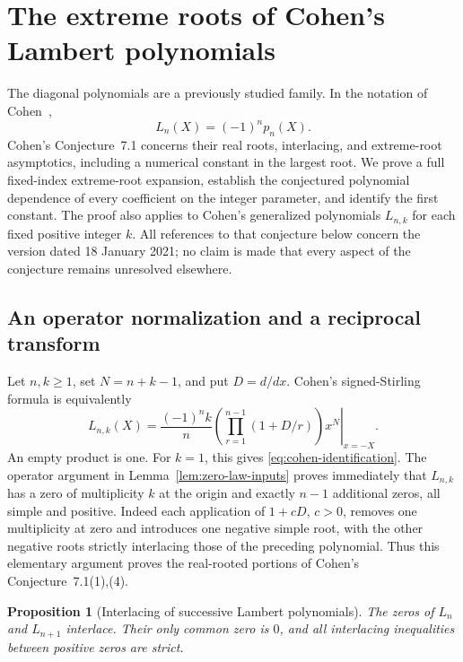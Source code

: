 \documentclass[11pt]{article}
\numberwithin{equation}{section}
\newtheorem{proposition}[theorem]{Proposition}
\theoremstyle{definition}
\theoremstyle{remark}
\begin{document}
\section{The extreme roots of Cohen's Lambert polynomials}
\label{sec:cohen-edges}

The diagonal polynomials are a previously studied family.  In the
notation of Cohen~\cite[Proposition~4.8]{Cohen2021},
\begin{equation}\label{eq:cohen-identification}
 L_n(X)=(-1)^n p_n(X).
\end{equation}
Cohen's Conjecture~7.1 concerns their real roots, interlacing, and
extreme-root asymptotics, including a numerical constant in the largest
root.  We prove a full fixed-index extreme-root expansion, establish
the conjectured polynomial dependence of every coefficient on the
integer parameter, and identify the first constant.  The proof
also applies to Cohen's generalized polynomials
$L_{n,k}$ for each fixed positive integer $k$.  All references to that
conjecture below concern the version dated 18 January 2021; no claim is
made that every aspect of the conjecture remains unresolved elsewhere.

\subsection{An operator normalization and a reciprocal transform}

Let $n,k\geq1$, set $N=n+k-1$, and put $D=d/dx$.  Cohen's signed-Stirling
formula is equivalently
\begin{equation}\label{eq:cohen-operator}
 L_{n,k}(X)=\frac{(-1)^n k}{n}
   \left.\left(\prod_{r=1}^{n-1}(1+D/r)\right)x^N\right|_{x=-X}.
\end{equation}
An empty product is one.  For $k=1$, this gives
\eqref{eq:cohen-identification}.  The operator argument in
Lemma~\ref{lem:zero-law-inputs} proves immediately that $L_{n,k}$ has
a zero of multiplicity $k$ at the origin and exactly $n-1$ additional
zeros, all simple and positive.  Indeed each application of $1+cD$,
$c>0$, removes one multiplicity at zero and introduces one negative
simple root, with the other negative roots strictly interlacing those
of the preceding polynomial.  Thus this elementary argument proves
the real-rooted portions of Cohen's Conjecture~7.1(1),(4).

\begin{proposition}[Interlacing of successive Lambert polynomials]
\label{prop:cohen-interlacing}
The zeros of $L_n$ and $L_{n+1}$ interlace.  Their only common zero
is $0$, and all interlacing inequalities between positive zeros are
strict.
\end{proposition}
\end{document}
